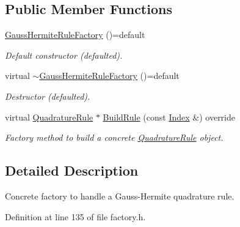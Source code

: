 \subsection*{Public Member Functions}
\begin{DoxyCompactItemize}
\item 
\hypertarget{classGaussHermiteRuleFactory_a192b5732878d8393276226a4f359f1cd}{\hyperlink{classGaussHermiteRuleFactory_a192b5732878d8393276226a4f359f1cd}{Gauss\-Hermite\-Rule\-Factory} ()=default}\label{classGaussHermiteRuleFactory_a192b5732878d8393276226a4f359f1cd}

\begin{DoxyCompactList}\small\item\em Default constructor (defaulted). \end{DoxyCompactList}\item 
\hypertarget{classGaussHermiteRuleFactory_ae01722716cbf1c2d540f8d8079208b92}{virtual \hyperlink{classGaussHermiteRuleFactory_ae01722716cbf1c2d540f8d8079208b92}{$\sim$\-Gauss\-Hermite\-Rule\-Factory} ()=default}\label{classGaussHermiteRuleFactory_ae01722716cbf1c2d540f8d8079208b92}

\begin{DoxyCompactList}\small\item\em Destructor (defaulted). \end{DoxyCompactList}\item 
virtual \hyperlink{classQuadratureRule}{Quadrature\-Rule} $\ast$ \hyperlink{classGaussHermiteRuleFactory_a1e907a5209041516fa18c86c79fb1ec6}{Build\-Rule} (const \hyperlink{typedefs_8h_a2c726f8f32697958e9d6c2afecda531d}{Index} \&) override
\begin{DoxyCompactList}\small\item\em Factory method to build a concrete \hyperlink{classQuadratureRule}{Quadrature\-Rule} object. \end{DoxyCompactList}\end{DoxyCompactItemize}


\subsection{Detailed Description}
Concrete factory to handle a Gauss-\/\-Hermite quadrature rule. 

Definition at line 135 of file factory.\-h.



